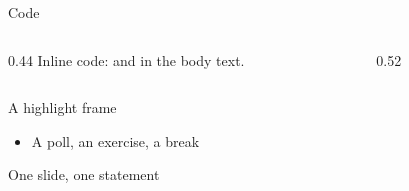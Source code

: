 \documentclass[aspectratio=169]{beamer}
\begin{document}
\begin{standardframe}{Code}
	\begin{columns}[T,onlytextwidth]
		\begin{column}{0.44\linewidth}
			Inline code:  and  in the body text.
		\end{column}
		\begin{column}{0.52\linewidth}
		\end{column}
	\end{columns}
\end{standardframe}

\begin{highlightframe}{A highlight frame}
	\begin{itemize}
		\item A poll, an exercise, a break
	\end{itemize}
\end{highlightframe}

\begin{frame}[standout]
	One slide, one statement
\end{frame}

\end{document}
